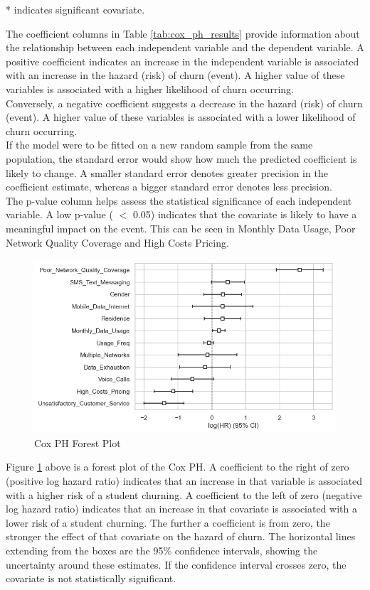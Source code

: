 \documentclass[doublespacing,12pt]{report}
\begin{document}
{* indicates significant covariate.}
\vspace{0.4cm}\\
\normalsize{\noindent The coefficient columns in Table \ref{tab:cox_ph_results} provide information about the relationship between each independent variable and the dependent variable. A positive coefficient indicates an increase in the independent variable is associated with an increase in the hazard (risk) of churn (event). A higher value of these variables is associated with a higher likelihood of churn occurring. \\
Conversely, a negative coefficient suggests a decrease in the hazard (risk) of churn (event). A higher value of these variables is associated with a lower likelihood of churn occurring.\\
\noindent If the model were to be fitted on a new random sample from the same population, the standard error would show how much the predicted coefficient is likely to change. A smaller standard error denotes greater precision in the coefficient estimate, whereas a bigger standard error denotes less precision.\\
\noindent The p-value column helps assess the statistical significance of each independent variable. A low p-value ( \(<\) 0.05) indicates that the covariate is likely to have a meaningful impact on the event. This can be seen in Monthly Data Usage, Poor Network Quality Coverage and High Costs Pricing.

\begin{figure}[H]
    \centering
    \includegraphics[width=1\linewidth]{Figure 4/4.2.png}
    \caption{Cox PH Forest Plot}
    \label{cox ph forest}
\end{figure}

\normalsize {\noindent Figure \ref{cox ph forest} above is a forest plot of the Cox PH. A coefficient to the right of zero (positive log hazard ratio) indicates that an increase in that variable is associated with a higher risk of a student churning. A coefficient to the left of zero (negative log hazard ratio) indicates that an increase in that covariate is associated with a lower risk of a student churning.
The further a coefficient is from zero, the stronger the effect of that covariate on the hazard of churn.
The horizontal lines extending from the boxes are the 95\% confidence intervals, showing the uncertainty around these estimates. If the confidence interval crosses zero, the covariate is not statistically significant.}

}
\end{document}

